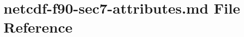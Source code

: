 \hypertarget{netcdf-f90-sec7-attributes_8md}{}\section{netcdf-\/f90-\/sec7-\/attributes.md File Reference}
\label{netcdf-f90-sec7-attributes_8md}
